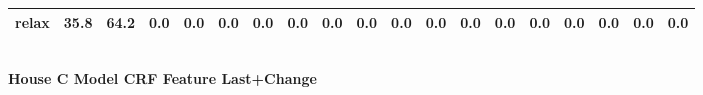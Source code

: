 \documentclass{article}
\begin{document}
\begin{sideways}
\begin{tabular}{lrrrrrrrrrrrrrrrrrr}
relax                         &        35.8 &               64.2 &           0.0 &                          0.0 &                0.0 &                0.0 &                        0.0 &          0.0 &              0.0 &                0.0 &                    0.0 &                      0.0 &                  0.0 &                   0.0 &              0.0 &              0.0 &                                  0.0 &          0.0 \\
\bottomrule
\end{tabular}
\end{sideways}
\normalsize
\vspace{1cm}\\
\textbf{House C Model CRF Feature Last+Change}\\
\vspace{1cm}\\
\end{document}
